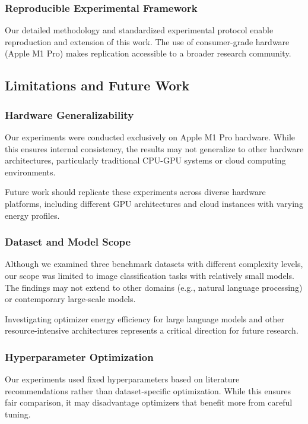 \documentclass[conference]{IEEEtran}
\begin{document}
\subsubsection{Reproducible Experimental Framework}

Our detailed methodology and standardized experimental protocol enable reproduction and extension of this work. The use of consumer-grade hardware (Apple M1 Pro) makes replication accessible to a broader research community.

\subsection{Limitations and Future Work}

\subsubsection{Hardware Generalizability}

Our experiments were conducted exclusively on Apple M1 Pro hardware. While this ensures internal consistency, the results may not generalize to other hardware architectures, particularly traditional CPU-GPU systems or cloud computing environments.

Future work should replicate these experiments across diverse hardware platforms, including different GPU architectures and cloud instances with varying energy profiles.

\subsubsection{Dataset and Model Scope}

Although we examined three benchmark datasets with different complexity levels, our scope was limited to image classification tasks with relatively small models. The findings may not extend to other domains (e.g., natural language processing) or contemporary large-scale models.

Investigating optimizer energy efficiency for large language models and other resource-intensive architectures represents a critical direction for future research.

\subsubsection{Hyperparameter Optimization}

Our experiments used fixed hyperparameters based on literature recommendations rather than dataset-specific optimization. While this ensures fair comparison, it may disadvantage optimizers that benefit more from careful tuning.
\end{document}

